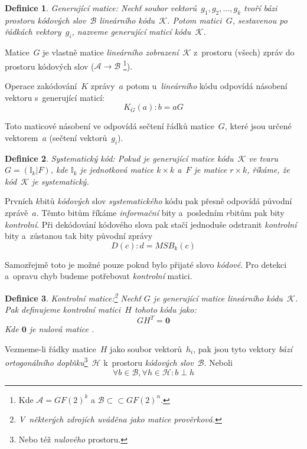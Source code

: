 \documentclass[thesis=M,czech,hidelinks]{FITthesis}[2012/06/26]
\newcommand{\0}{{\textcolor[gray]{0.75}{0}}}
\newtheorem{definice}{Definice}
\begin{document}
\begin{definice}{Generující matice:}
    Nechť soubor vektorů~$g_1,g_2,\ldots,g_k$ tvoří bázi prostoru
    kódových slov~$\mathcal{B}$ \emph{lineárního kódu}~$\mathcal{K}$. Potom
    matici~$G$, sestavenou po řádkách vektory~$g_i$, nazveme \emph{generující
    maticí} kódu~$\mathcal{K}$.
\end{definice}

Matice~$G$ je vlastně matice \emph{lineárního zobrazení}~$\mathcal{K}$
z~prostoru (všech) zpráv do prostoru kódových slov
($\mathcal{A} \to \mathcal{B}$ \footnote{
    Kde $\mathcal{A} = GF(2)^k$ a $\mathcal{B} \subset \subset GF(2)^n$.
}).

Operace zakódování~$K$ zprávy~$a$ potom u~\emph{lineárního} kódu odpovídá
násobení vektoru s~generující maticí:
$$ K_G(a) : b = aG $$

Toto maticové násobení ve odpovídá sečtení řádků matice~$G$, které
jsou určené vektorem~$a$ (sečtení vektorů~$g_i$).

\begin{definice}{Systematický kód:}
    Pokud je \emph{generující} matice kódu~$\mathcal{K}$ ve tvaru \\
    $G=(\mathbb{I}_k|F)$, kde $\mathbb{I}_k$ je jednotková matice $k \times k$
    a~$F$ je matice $r \times k$, říkáme, že kód~$\mathcal{K}$ je
    \emph{systematický}.
\end{definice}

Prvních $k$\;bitů \emph{kódových} slov \emph{systematického} kódu pak přesně
odpovídá původní zprávě~$a$. Těmto bitům říkáme \emph{informační} bity
a~posledním $r$\;bitům pak bity \emph{kontrolní}. Při dekódování kódového slova
pak stačí jednoduše odstranit \emph{kontrolní} bity a~zůstanou tak bity původní
zprávy
$$ D(c) : d = MSB_k(c) $$

Samozřejmě toto je možné pouze pokud bylo přijaté slovo \emph{kódové}. Pro
detekci a~opravu chyb budeme potřebovat \emph{kontrolní} matici.

\begin{definice}{Kontrolní matice:}\footnote{
    V~některých zdrojích uváděna jako matice \emph{prověrková}.
}
    Nechť $G$ je \emph{generující} matice \emph{lineárního kódu}~$\mathcal{K}$.
    Pak definujeme \emph{kontrolní matici}~$H$ tohoto kódu jako:
    $$ G H^T = \textbf{0} $$
    Kde $\textbf{0}$ je \emph{nulová matice} .
\end{definice}


Vezmeme-li řádky matice~$H$ jako soubor vektorů~$h_i$, pak jsou tyto vektory
\emph{bází} \emph{ortogonálního doplňku}\footnote{
    Nebo též \emph{nulového} prostoru.
}~$\mathcal{H}$ k~prostoru \emph{kódových slov}~$\mathcal{B}$. Neboli
$$ \forall b \in \mathcal{B}, \forall h \in \mathcal{H} : b \perp h $$
\end{document}

